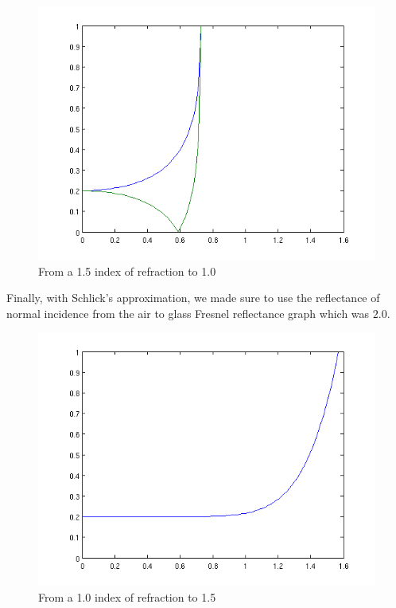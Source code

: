 \documentclass{article}
\begin{document}
\begin{figure}[h]
	\centering
	\includegraphics[scale=0.5]{pics/part1/glass2air.png}
	\caption{From a 1.5 index of refraction to 1.0}
\end{figure}

\newpage

Finally, with Schlick's approximation, we made sure to use the reflectance
of normal incidence from the air to glass Fresnel reflectance graph which 
was $2.0$.

\begin{figure}[h]
	\centering	
	\includegraphics[scale=0.5]{pics/part1/Schlick.png}
	\caption{From a 1.0 index of refraction to 1.5}
\end{figure}
\end{document}
